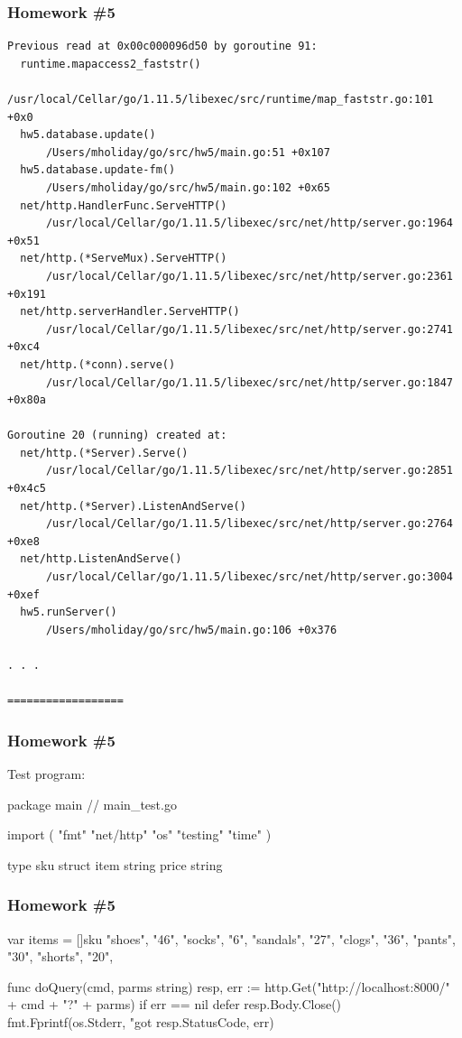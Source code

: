 \documentclass[handout,compress,t,11pt]{beamer}
\begin{document}
\begin{frame}[fragile]
\frametitle{Homework \#5}
{\tiny
\begin{verbatim}
Previous read at 0x00c000096d50 by goroutine 91:
  runtime.mapaccess2_faststr()
      /usr/local/Cellar/go/1.11.5/libexec/src/runtime/map_faststr.go:101 +0x0
  hw5.database.update()
      /Users/mholiday/go/src/hw5/main.go:51 +0x107
  hw5.database.update-fm()
      /Users/mholiday/go/src/hw5/main.go:102 +0x65
  net/http.HandlerFunc.ServeHTTP()
      /usr/local/Cellar/go/1.11.5/libexec/src/net/http/server.go:1964 +0x51
  net/http.(*ServeMux).ServeHTTP()
      /usr/local/Cellar/go/1.11.5/libexec/src/net/http/server.go:2361 +0x191
  net/http.serverHandler.ServeHTTP()
      /usr/local/Cellar/go/1.11.5/libexec/src/net/http/server.go:2741 +0xc4
  net/http.(*conn).serve()
      /usr/local/Cellar/go/1.11.5/libexec/src/net/http/server.go:1847 +0x80a

Goroutine 20 (running) created at:
  net/http.(*Server).Serve()
      /usr/local/Cellar/go/1.11.5/libexec/src/net/http/server.go:2851 +0x4c5
  net/http.(*Server).ListenAndServe()
      /usr/local/Cellar/go/1.11.5/libexec/src/net/http/server.go:2764 +0xe8
  net/http.ListenAndServe()
      /usr/local/Cellar/go/1.11.5/libexec/src/net/http/server.go:3004 +0xef
  hw5.runServer()
      /Users/mholiday/go/src/hw5/main.go:106 +0x376

. . .

==================
\end{verbatim}}
\end{frame}

\begin{frame}[fragile]
    \frametitle{Homework \#5}
    Test program:
\begin{golang}
package main // main_test.go

import (
	"fmt"
	"net/http"
	"os"
	"testing"
	"time"
)

type sku struct {
	item  string
	price string
}
\end{golang}
\end{frame}

\begin{frame}[fragile]
    \frametitle{Homework \#5}
\begin{golang}
var items = []sku{
	{"shoes", "46"},
	{"socks", "6"},
	{"sandals", "27"},
	{"clogs", "36"},
	{"pants", "30"},
	{"shorts", "20"},
}

func doQuery(cmd, parms string) {
	resp, err := http.Get("http://localhost:8000/" +
                          cmd + "?" + parms)
	if err == nil {
		defer resp.Body.Close()
	}
	fmt.Fprintf(os.Stderr, "got %
                resp.StatusCode, err)
}
\end{golang}
\end{frame}
\end{document}
